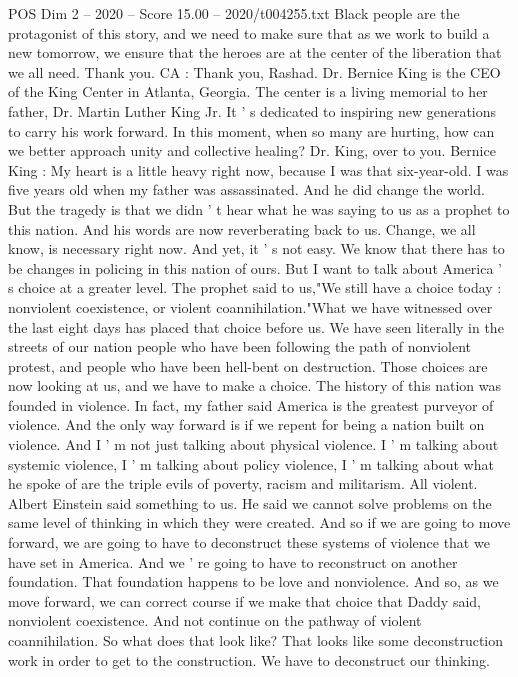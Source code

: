 \begin{textsample}{POS Dim 2 – 2020 – Score 15.00 – 2020/t004255.txt}
Black people are the protagonist of this story, and we need to make sure that as we work to build a new tomorrow, we ensure that the heroes are at the center of the liberation that we all need.
Thank you.
CA : Thank you, Rashad.
Dr.
Bernice King is the CEO of the King Center in Atlanta, Georgia.
The center is a living memorial to her father, Dr.
Martin Luther King Jr.
It ' s dedicated to inspiring new generations to carry his work forward.
In this moment, when so many are hurting, how can we better approach unity and collective healing?
Dr.
King, over to you.
Bernice King : My heart is a little heavy right now, because I was that six-year-old.
I was five years old when my father was assassinated.
And he did change the world.
But the tragedy is that we didn ' t hear what he was saying to us as a prophet to this nation.
And his words are now reverberating back to us.
Change, we all know, is necessary right now.
And yet, it ' s not easy.
We know that there has to be changes in policing in this nation of ours.
But I want to talk about America ' s choice at a greater level.
The prophet said to us,"We still have a choice today : nonviolent coexistence, or violent coannihilation."What we have witnessed over the last eight days has placed that choice before us.
We have seen literally in the streets of our nation people who have been following the path of nonviolent protest, and people who have been hell-bent on destruction.
Those choices are now looking at us, and we have to make a choice.
The history of this nation was founded in violence.
In fact, my father said America is the greatest purveyor of violence.
And the only way forward is if we repent for being a nation built on violence.
And I ' m not just talking about physical violence.
I ' m talking about systemic violence, I ' m talking about policy violence, I ' m talking about what he spoke of are the triple evils of poverty, racism and militarism.
All violent.
Albert Einstein said something to us.
He said we cannot solve problems on the same level of thinking in which they were created.
And so if we are going to move forward, we are going to have to deconstruct these systems of violence that we have set in America.
And we ' re going to have to reconstruct on another foundation.
That foundation happens to be love and nonviolence.
And so, as we move forward, we can correct course if we make that choice that Daddy said, nonviolent coexistence.
And not continue on the pathway of violent coannihilation.
So what does that look like?
That looks like some deconstruction work in order to get to the construction.
We have to deconstruct our thinking.

\end{textsample}
